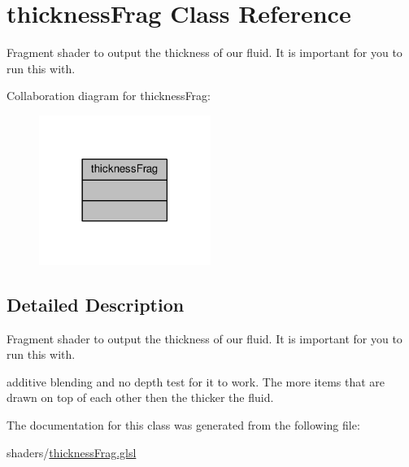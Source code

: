 \hypertarget{classthickness_frag}{\section{thickness\-Frag Class Reference}
\label{classthickness_frag}
}


Fragment shader to output the thickness of our fluid. It is important for you to run this with.  




Collaboration diagram for thickness\-Frag\-:\nopagebreak
\begin{figure}[H]
\begin{center}
\leavevmode
\includegraphics[width=158pt]{classthickness_frag__coll__graph}
\end{center}
\end{figure}


\subsection{Detailed Description}
Fragment shader to output the thickness of our fluid. It is important for you to run this with. 

additive blending and no depth test for it to work. The more items that are drawn on top of each other then the thicker the fluid. 

The documentation for this class was generated from the following file\-:\begin{DoxyCompactItemize}
\item 
shaders/\hyperlink{thickness_frag_8glsl}{thickness\-Frag.\-glsl}\end{DoxyCompactItemize}
